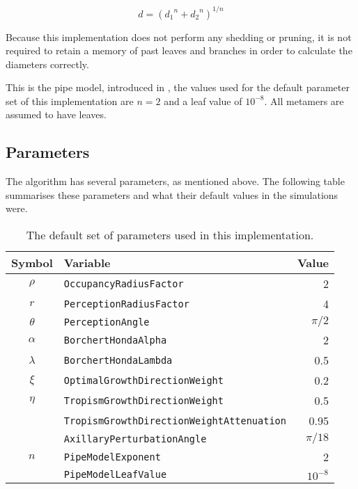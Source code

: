 \documentclass{article}
\begin{document}
\[d = \left({d_1}^n + {d_2}^n\right)^{1 / n}\]

Because this implementation does not perform any shedding or pruning, it is not required to retain a memory of past leaves and branches in order to calculate the diameters correctly.

This is the pipe model, introduced in \cite{Shinozaki1964}, the values used for the default parameter set of this implementation are \(n = 2\) and a leaf value of \(10^{-8}\). All metamers are assumed to have leaves.

\subsection{Parameters}

The algorithm has several parameters, as mentioned above. The following table summarises these parameters and what their default values in the simulations were.

\begin{table}[H]
    \centering
    \begin{tabular}{c|l|r}
    Symbol & Variable & Value \\
    \hline
    \(\rho\)    & \texttt{OccupancyRadiusFactor}                   & 2            \\
    \(r\)       & \texttt{PerceptionRadiusFactor}                  & 4            \\
    \(\theta\)  & \texttt{PerceptionAngle}                         & \(\pi / 2\)  \\
    \hline
    \(\alpha\)  & \texttt{BorchertHondaAlpha}                      & 2            \\
    \(\lambda\) & \texttt{BorchertHondaLambda}                     & 0.5          \\
    \hline
    \(\xi\)     & \texttt{OptimalGrowthDirectionWeight}            & 0.2          \\
    \(\eta\)    & \texttt{TropismGrowthDirectionWeight}            & 0.5          \\
                & \texttt{TropismGrowthDirectionWeightAttenuation} & 0.95         \\
                & \texttt{AxillaryPerturbationAngle}               & \(\pi / 18\) \\
    \hline
    \(n\)       & \texttt{PipeModelExponent}                       & 2            \\
                & \texttt{PipeModelLeafValue}                      & \(10^{-8}\)  \\
    \hline
    \end{tabular}
    \caption{The default set of parameters used in this implementation.}
\end{table}
\end{document}
